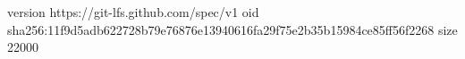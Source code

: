 version https://git-lfs.github.com/spec/v1
oid sha256:11f9d5adb622728b79e76876e13940616fa29f75e2b35b15984ce85ff56f2268
size 22000
